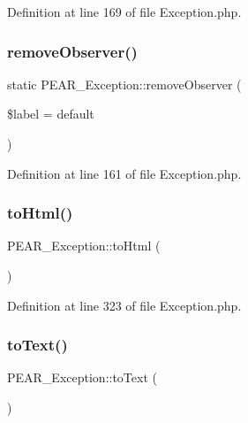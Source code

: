 Definition at line 169 of file Exception.\+php.

\hypertarget{classPEAR__Exception_ac5a5c181030c19d81f280ab8190b5909}{}\label{classPEAR__Exception_ac5a5c181030c19d81f280ab8190b5909} 
\subsubsection{\texorpdfstring{remove\+Observer()}{removeObserver()}}
{\footnotesize\ttfamily static P\+E\+A\+R\+\_\+\+Exception\+::remove\+Observer (\begin{DoxyParamCaption}\item[{}]{\$label = {\ttfamily \textquotesingle{}default\textquotesingle{}} }\end{DoxyParamCaption})\hspace{0.3cm}{\ttfamily [static]}}



Definition at line 161 of file Exception.\+php.

\hypertarget{classPEAR__Exception_ab69d689242e40974b2675cf25aa68068}{}\label{classPEAR__Exception_ab69d689242e40974b2675cf25aa68068} 
\subsubsection{\texorpdfstring{to\+Html()}{toHtml()}}
{\footnotesize\ttfamily P\+E\+A\+R\+\_\+\+Exception\+::to\+Html (\begin{DoxyParamCaption}{ }\end{DoxyParamCaption})}



Definition at line 323 of file Exception.\+php.

\hypertarget{classPEAR__Exception_ad3b5a0285226613b02b1730b2d632bd1}{}\label{classPEAR__Exception_ad3b5a0285226613b02b1730b2d632bd1} 
\subsubsection{\texorpdfstring{to\+Text()}{toText()}}
{\footnotesize\ttfamily P\+E\+A\+R\+\_\+\+Exception\+::to\+Text (\begin{DoxyParamCaption}{ }\end{DoxyParamCaption})}



